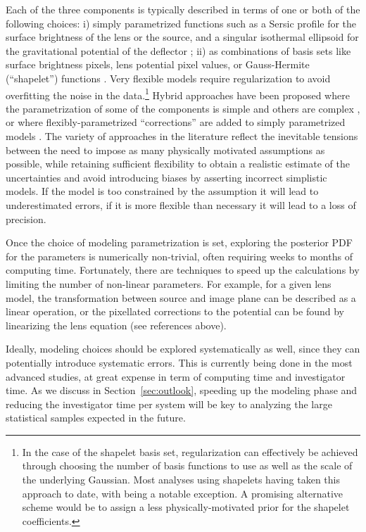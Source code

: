 Each of the three components is typically described in terms of one or
both of the following choices:
i) simply parametrized functions such as a Sersic profile
for the surface brightness of the lens or the source, and a singular
isothermal ellipsoid for the gravitational potential of the deflector
\citep[e.g.][]{Mar++07,Kne++11,Kee11}; ii) as combinations of basis sets like surface brightness
pixels, lens potential pixel values, or Gauss-Hermite (``shapelet'')
functions
\citep[e.g.][]{Col08, BirrerEtal2015, Nig++15, TagoreAndJackson2016}.
Very flexible models require regularization to avoid overfitting the
noise in the data.\footnote{In the case of the shapelet basis set,
regularization can effectively be achieved through choosing the number of basis
functions to use as well as the scale of the underlying Gaussian. Most
analyses using shapelets having taken this approach to date, with
\citet{TagoreAndJackson2016} being a notable exception. A
promising alternative scheme would be to assign a less physically-motivated prior for the
shapelet coefficients.}
Hybrid approaches have been proposed where the parametrization of some of
the components is simple and others are complex
\citep{W+D03,T+K04,BrewerAndLewis2006,Suy++06,S+H10}, or where flexibly-parametrized
``corrections'' are added to simply parametrized models
\citep{Koo05,V+K09,Suy++09,BirrerEtal2015}.  The variety of approaches
in the literature reflect the inevitable tensions between the need to
impose as many physically motivated assumptions as possible, while
retaining sufficient flexibility to obtain a realistic estimate of the
uncertainties and avoid introducing biases by asserting incorrect
simplistic models. If the model is too constrained by the assumption
it will lead to underestimated errors, if it is more flexible than
necessary it will lead to a loss of precision.

Once the choice of modeling parametrization is set, exploring the
posterior PDF for the parameters is numerically non-trivial, often requiring weeks to months
of computing time. Fortunately, there are techniques to speed up the
calculations by limiting the number of non-linear parameters. For
example, for a given lens model, the transformation between source and
image plane can be described as a linear operation, or the pixellated
corrections to the potential can be found by linearizing the lens
equation (see references above).

Ideally, modeling choices should be explored systematically as well,
since they can potentially introduce systematic errors. This is
currently being done in the most advanced studies, at great expense in
term of computing time and investigator time. As we discuss in
Section~\ref{sec:outlook}, speeding up the modeling phase and reducing
the investigator time per system will be key to analyzing the large
statistical samples expected in the future.

